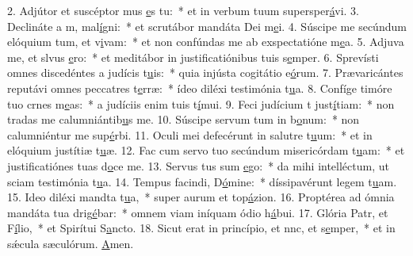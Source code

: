 2. Adjútor et suscéptor mus \uline{e}s tu:~* et in verbum tuum supersper\uline{á}vi.
3. Declináte a m, mal\uline{í}gni:~* et scrutábor mandáta Dei m\uline{e}i.
4. Súscipe me secúndum elóquium tum, et v\uline{i}vam:~* et non confúndas me ab exspectatióne m\uline{e}a.
5. Adjuva me, et slvus \uline{e}ro:~* et meditábor in justificatiónibus tuis s\uline{e}mper.
6. Sprevísti omnes discedéntes a judícis t\uline{u}is:~* quia injústa cogitátio e\uline{ó}rum.
7. Prævaricántes reputávi omnes peccatres t\uline{e}rræ:~* ídeo diléxi testimónia t\uline{u}a.
8. Confíge timóre tuo crnes m\uline{e}as:~* a judíciis enim tuis t\uline{í}mui.
9. Feci judícium t just\uline{í}tiam:~* non tradas me calumniántib\uline{u}s me.
10. Súscipe servum tum in b\uline{o}num:~* non calumniéntur me sup\uline{é}rbi.
11. Oculi mei defecérunt in salutre t\uline{u}um:~* et in elóquium justítiæ t\uline{u}æ.
12. Fac cum servo tuo secúndum misericórdam t\uline{u}am:~* et justificatiónes tuas d\uline{o}ce me.
13. Servus tus sum \uline{e}go:~* da mihi intelléctum, ut sciam testimónia t\uline{u}a.
14. Tempus facindi, D\uline{ó}mine:~* díssipavérunt legem t\uline{u}am.
15. Ideo diléxi mandta t\uline{u}a,~* super aurum et top\uline{á}zion.
16. Proptérea ad ómnia mandáta tua drig\uline{é}bar:~* omnem viam iníquam ódio h\uline{á}bui.
17. Glória Patr, et F\uline{í}lio,~* et Spirítui S\uline{a}ncto.
18. Sicut erat in princípio, et nnc, et s\uline{e}mper,~* et in sǽcula sæculórum. \uline{A}men.

